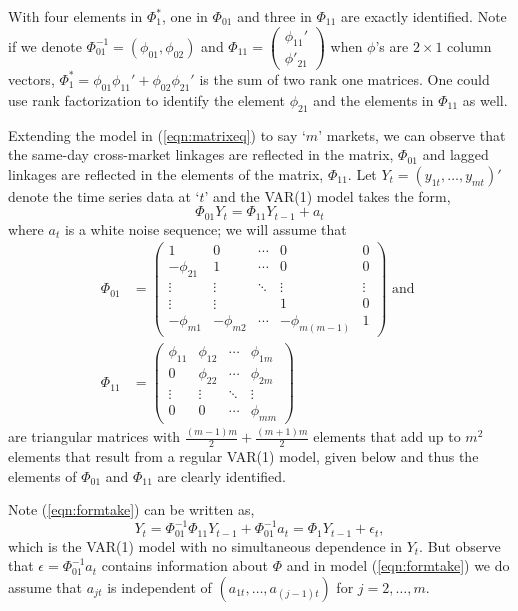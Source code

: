 With four elements in $\Phi_1^*$, one in $\Phi_{01}$ and three in $\Phi_{11}$ are exactly identified. Note  if we denote $\Phi^{-1}_{01} = (\phi_{01},\phi_{02})$ and $\Phi_{11} = \begin{pmatrix} \phi_{11}' \\ \phi'_{21} \end{pmatrix}$ when $\phi$'s are $2 \times 1$ column vectors, $\Phi_1^*=\phi_{01}\phi_{11}' + \phi_{02} \phi_{21}'$  is the sum of two rank one matrices. One could use rank factorization to identify the element $\phi_{21}$ and the elements in $\Phi_{11}$ as well. 


Extending the model in (\ref{eqn:matrixeq}) to say `$m$' markets, we can observe that the same-day cross-market linkages are reflected in the matrix, $\Phi_{01}$ and lagged linkages are reflected in the elements of the matrix, $\Phi_{11}$. Let $Y_t = (y_{1t} ,\ldots, y_{mt})'$ denote the time series data at `$t$' and the VAR(1) model takes the form,
	\begin{equation}\label{eqn:formtake}
	\Phi_{01} Y_t= \Phi_{11} Y_{t-1} + a_t
	\end{equation}
where $a_t$ is a white noise sequence; we will assume that
	\[
	\begin{split}
	\Phi_{01}&= \begin{pmatrix} 
	1 & 0 & \cdots & 0 & 0 \\
	-\phi_{21} &  1 & \cdots & 0 & 0 \\
	\vdots & \vdots &  \ddots & \vdots & \vdots \\
	\vdots & \vdots & & 1  & 0 \\
	-\phi_{m1} & -\phi_{m2} & \cdots & -\phi_{m(m-1)} &  1 
	\end{pmatrix} \text{ and } \\
	\Phi_{11}&= \begin{pmatrix}
	\phi_{11} &  \phi_{12} &  \cdots & \phi_{1m} \\
	0 & \phi_{22} & \cdots & \phi_{2m} \\
	\vdots & \vdots & \ddots & \vdots \\
	0 & 0 & \cdots & \phi_{mm} 
	\end{pmatrix}
	\end{split}
	\]
are triangular matrices with $\frac{(m-1)m}{2}+ \frac{(m+1)m}{2}$ elements that add up to $m^2$ elements that result from a regular VAR(1) model, given below and thus the elements of $\Phi_{01}$
and $\Phi_{11}$ are clearly identified. 


Note (\ref{eqn:formtake}) can be written as,
	\begin{equation}\label{eqn:rewrittenas}
	Y_t= \Phi_{01}^{-1} \Phi_{11} Y_{t-1} + \Phi_{01}^{-1} a_t = \Phi_1 Y_{t-1} + \epsilon_t,
	\end{equation}
which is the VAR(1) model with no simultaneous dependence in $Y_t$. But observe that $\epsilon= \Phi_{01}^{-1} a_t$ contains information about $\Phi$ and in model (\ref{eqn:formtake}) we do assume that  $a_{jt}$ is independent of $(a_{1t},\ldots, a_{(j-1)t})$ for $j = 2,\ldots,m$.


